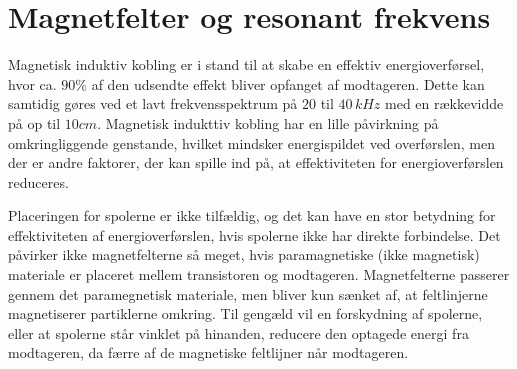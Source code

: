 \section{Magnetfelter og resonant frekvens}

Magnetisk induktiv kobling er i stand til at skabe en effektiv energioverførsel, hvor ca. $90\%$ af den udsendte effekt bliver opfanget af modtageren. Dette kan samtidig gøres ved et lavt frekvensspektrum på $20$ til $40 \, kHz$ med en rækkevidde på op til $10cm$. Magnetisk indukttiv kobling har en lille påvirkning på omkringliggende genstande, hvilket mindsker energispildet ved overførslen, men der er andre faktorer, der kan spille ind på, at effektiviteten for energioverførslen reduceres.

Placeringen for spolerne er ikke tilfældig, og det kan have en stor betydning for effektiviteten af energioverførslen, hvis spolerne ikke har direkte forbindelse. Det påvirker ikke magnetfelterne så meget, hvis paramagnetiske (ikke magnetisk) materiale er placeret mellem transistoren og modtageren. Magnetfelterne passerer gennem det paramegnetisk materiale, men bliver kun sænket af, at feltlinjerne magnetiserer partiklerne omkring. Til gengæld vil en forskydning af spolerne, eller at spolerne står vinklet på hinanden, reducere den optagede energi fra modtageren, da færre af de magnetiske feltlijner når modtageren.

